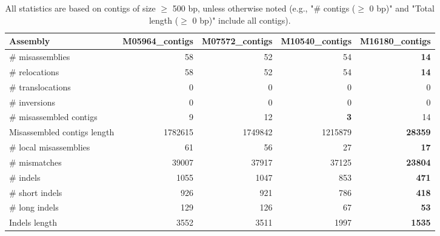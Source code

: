 \documentclass[12pt,a4paper]{article}
\begin{document}
\begin{table}[ht]
\begin{center}
\caption{All statistics are based on contigs of size $\geq$ 500 bp, unless otherwise noted (e.g., "\# contigs ($\geq$ 0 bp)" and "Total length ($\geq$ 0 bp)" include all contigs).}
\begin{tabular}{|l*{4}{|r}|}
\hline
Assembly & M05964\_contigs & M07572\_contigs & M10540\_contigs & M16180\_contigs \\ \hline
\# misassemblies & 58 & 52 & 54 & {\bf 14} \\ \hline
\hspace{5mm}\# relocations & 58 & 52 & 54 & {\bf 14} \\ \hline
\hspace{5mm}\# translocations & 0 & 0 & 0 & 0 \\ \hline
\hspace{5mm}\# inversions & 0 & 0 & 0 & 0 \\ \hline
\# misassembled contigs & 9 & 12 & {\bf 3} & 14 \\ \hline
Misassembled contigs length & 1782615 & 1749842 & 1215879 & {\bf 28359} \\ \hline
\# local misassemblies & 61 & 56 & 27 & {\bf 17} \\ \hline
\# mismatches & 39007 & 37917 & 37125 & {\bf 23804} \\ \hline
\# indels & 1055 & 1047 & 853 & {\bf 471} \\ \hline
\hspace{5mm}\# short indels & 926 & 921 & 786 & {\bf 418} \\ \hline
\hspace{5mm}\# long indels & 129 & 126 & 67 & {\bf 53} \\ \hline
Indels length & 3552 & 3511 & 1997 & {\bf 1535} \\ \hline
\end{tabular}
\end{center}
\end{table}
\end{document}
